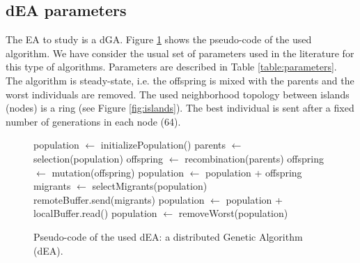 \documentclass[final,1p,times]{elsarticle}
\begin{document}
\subsection{dEA parameters}
The EA to study is a dGA. Figure \ref{fig:EA} shows the pseudo-code of the used algorithm. We have consider the usual set of parameters used in the literature for this type of algorithms. Parameters are described in Table \ref{table:parameters}. The algorithm is steady-state, i.e. the offspring is mixed with the parents and the worst individuals are removed. The used neighborhood topology between islands (nodes) is a ring (see Figure \ref{fig:islands}). The best individual is sent after a fixed number of generations in each node (64).  %



\begin{figure}[htb]

\begin{algorithmic}
\STATE population $\gets$ initializePopulation()
    \STATE parents $\gets$ selection(population)
    \STATE offspring $\gets$ recombination(parents)
    \STATE offspring $\gets$ mutation(offspring)
    \STATE population $\gets$ population + offspring
      \STATE migrants $\gets$ selectMigrants(population)
      \STATE remoteBuffer.send(migrants)
    \ENDIF
      \STATE population $\gets$ population + localBuffer.read()
    \ENDIF
    \STATE population $\gets$ removeWorst(population)
\ENDWHILE

\end{algorithmic}
\caption{Pseudo-code of the used dEA: a distributed Genetic Algorithm (dEA).}
\label{fig:EA}
\end{figure}
\end{document}
